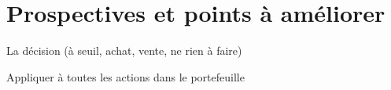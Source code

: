 

\section{Prospectives et points à améliorer}
 
La décision (à seuil, achat, vente, ne rien à faire)

Appliquer à toutes les actions dans le portefeuille